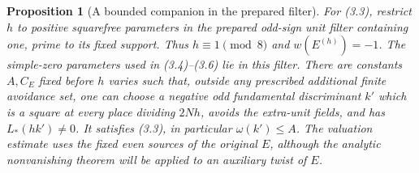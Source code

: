 \documentclass[11pt]{article}
\newtheorem{proposition}[theorem]{Proposition}
\theoremstyle{definition}
\theoremstyle{remark}
\begin{document}
\begin{proposition}[A bounded companion in the prepared filter]\label{ex:sec7-rough-companion}
For (3.3), restrict $h$ to positive squarefree parameters in the
prepared odd-sign unit filter containing one, prime to its fixed
support. Thus $h\equiv1\pmod8$ and $w(E^{(h)})=-1$.
The simple-zero parameters used in (3.4)--(3.6) lie in this filter.
There are constants $A,C_E$ fixed before $h$ varies such that,
outside any prescribed additional finite avoidance set, one can
choose a negative odd fundamental discriminant $k'$ which is a
square at every place dividing $2Nh$, avoids the extra-unit fields,
and has $L_*(hk')\ne0$. It satisfies (3.3), in particular
$\omega(k')\le A$. The valuation estimate uses the fixed even
sources of the original $E$, although the analytic nonvanishing
theorem will be applied to an auxiliary twist of $E$.
\end{proposition}
\end{document}
